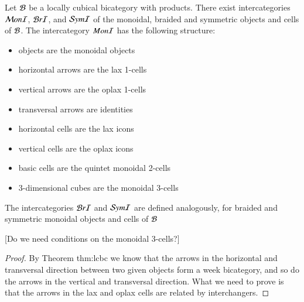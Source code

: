 \begin{thm}
Let $\mathcal{B}$ be a locally cubical bicategory with products. There exist intercategories $\mathcal{M} on\mathcal{I}$, $\mathcal{B} r\mathcal{I}$, and $\mathcal{S} ym\mathcal{I}$ of the monoidal, braided and symmetric objects and cells of $\mathcal{B}$. The intercategory $Mon\mathcal{I}$ has the following structure:
\begin{itemize}
\item objects are the monoidal objects 
\item horizontal arrows are the lax 1-cells
\item vertical arrows are the oplax 1-cells
\item transversal arrows are identities
\item horizontal cells are the lax icons
\item vertical cells are the oplax icons
\item basic cells are the quintet monoidal 2-cells
\item 3-dimensional cubes are the monoidal 3-cells
\end{itemize}
The intercategories $\mathcal{B} r\mathcal{I}$ and $\mathcal{S} ym\mathcal{I}$ are defined analogously, for braided and symmetric monoidal objects and cells of $\mathcal{B}$
\end{thm}

[Do we need conditions on the monoidal 3-cells?]
\begin{proof}
By Theorem {thm:lcbc} we know that the arrows in the horizontal and transversal direction between two given objects form a week bicategory, and so do the arrows in the vertical and transversal direction.
What we need to prove is that the arrows in the lax and oplax cells are related by interchangers.
\end{proof}



